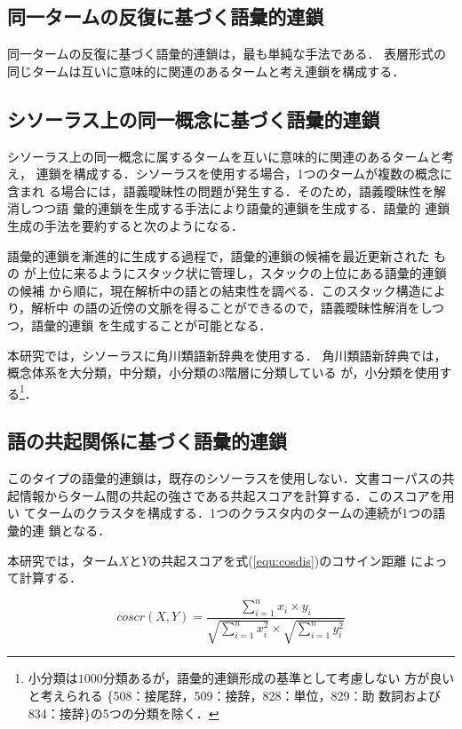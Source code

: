 \subsection{同一タームの反復に基づく語彙的連鎖}\label{ssec:repetition}
同一タームの反復に基づく語彙的連鎖は，最も単純な手法である．
表層形式の同じタームは互いに意味的に関連のあるタームと考え連鎖を構成する．

\subsection{シソーラス上の同一概念に基づく語彙的連鎖}\label{ssec:thesaurus}

シソーラス上の同一概念に属するタームを互いに意味的に関連のあるタームと考え，
連鎖を構成する．シソーラスを使用する場合，1つのタームが複数の概念に含まれ
る場合には，語義曖昧性の問題が発生する．そのため，語義曖昧性を解消しつつ語
彙的連鎖を生成する手法\cite{okumura:94a}により語彙的連鎖を生成する．語彙的
連鎖生成の手法を要約すると次のようになる．

語彙的連鎖を漸進的に生成する過程で，語彙的連鎖の候補を最近更新された
もの
が上位に来るようにスタック状に管理し，スタックの上位にある語彙的連鎖の候補
から順に，現在解析中の語との結束性を調べる．このスタック構造により，解析中
の語の近傍の文脈を得ることができるので，語義曖昧性解消をしつつ，語彙的連鎖
を生成することが可能となる．

本研究では，シソーラスに角川類語新辞典\cite{kadokawa}を使用する．
角川類語新辞典では，概念体系を大分類，中分類，小分類の3階層に分類している
が，小分類を使用する\footnote
{小分類は$1000$分類あるが，語彙的連鎖形成の基準として考慮しない
方が良いと考えられる \{508：接尾辞，509：接辞，828：単位，829：助
数詞および834：接辞\}の5つの分類を除く．}．

\subsection{語の共起関係に基づく語彙的連鎖}\label{ssec:cooccurrence}

このタイプの語彙的連鎖は，既存のシソーラスを使用しない．文書コーパスの共
起情報からターム間の共起の強さである共起スコアを計算する．このスコアを用い
てタームのクラスタを構成する．1つのクラスタ内のタームの連続が1つの語彙的連
鎖となる．

本研究では，ターム$X$と$Y$の共起スコアを式(\ref{equ:cosdis})のコサイン距離
によって計算する．

\begin{equation}\label{equ:cosdis}
coscr(X,Y) = \frac{\sum_{i=1}^{n} x_{i} \times y_{i}}
	{\sqrt{\sum_{i=1}^{n} x_{i}^{2}} \times \sqrt{\sum_{i=1}^{n}
	y_{i}^{2}}}
\end{equation}

